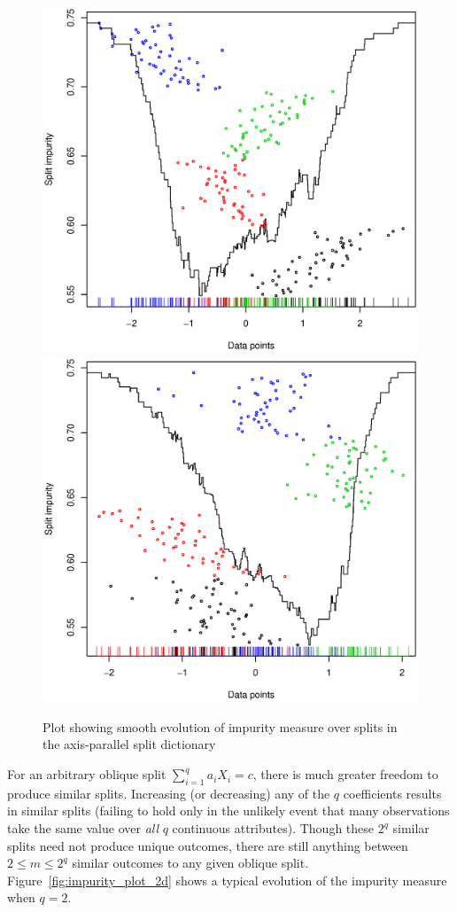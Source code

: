 \begin{figure}
\centering
\includegraphics[width=.49\textwidth]{impurity_plot_1d_crabs_data_pc2.ps}
\includegraphics[width=.49\textwidth]{impurity_plot_1d_crabs_data_pc3.ps}
\caption{Plot showing smooth evolution of impurity measure over splits in the axis-parallel split dictionary}
\label{fig:impurity_plot_1d}
\end{figure}

For an arbitrary oblique split $\sum_{i=1}^q a_i X_i=c$, there is much greater freedom to produce similar splits. Increasing (or decreasing) any of the $q$ coefficients results in similar splits (failing to hold only in the unlikely event that many observations take the same value over \emph{all} $q$ continuous attributes). Though these $2^q$ similar splits need not produce unique outcomes, there are still anything between $2\leq m \leq 2^q$ similar outcomes to any given oblique split. Figure~\ref{fig:impurity_plot_2d} shows a typical evolution of the impurity measure when $q=2$.\\

